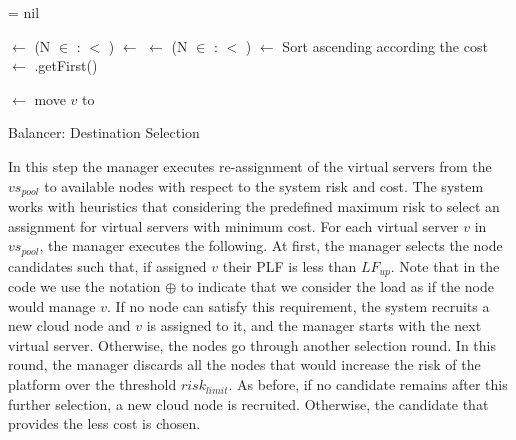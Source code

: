 \documentclass[final,10pt,a5paper]{phdimt}
\theoremstyle{definition}
\begin{document}
\begin{algorithm}[tbh]




\BlankLine

{
	\Chosen = nil\;

\Npool $\leftarrow$ (N $\in$ \AN :  $<$ \ULimit)\;
	{
		\Chosen $\leftarrow$ \CC{}\;
	}
	\Else
	{
		\Npool $\leftarrow$ (N $\in$ \Npool :  $<$ \Risklimit)\;
		{
			\Chosen $\leftarrow$ \CC{}\;
		}
		\Else
		{
			Sort \Npool ascending according the cost\;
			\Chosen $\leftarrow$ \Npool.getFirst()\;
		}
	}
	
	\Actions $\leftarrow$ move $v$ to \Chosen\;
}


\caption{Balancer: Destination Selection} 
\label{alg:second}
\end{algorithm}

In this step  the manager executes re-assignment of the virtual servers from the $vs_{pool}$ to available nodes with respect to the system risk and cost. 
The system works with heuristics that considering the predefined maximum risk to select an assignment for virtual servers with minimum cost. 
For each virtual server $v$ in $vs_{pool}$, the manager executes the following. 
At first, the manager selects the node candidates such that, if assigned $v$ their PLF is less than $LF_{up}$.
Note that in the code we use the notation $\oplus$ to indicate that we consider the load as if the node would manage $v$.
If no node can satisfy this requirement, the system recruits a new cloud node and $v$ is assigned to it, and the manager starts with the next virtual server. 
Otherwise, the nodes go through another selection round. In this round, the manager discards all the nodes that would increase the risk of the platform over the threshold $risk_{limit}$. As before, if no candidate remains after this further selection, a new cloud node is recruited.
Otherwise, the candidate that provides the less cost is chosen. 
\end{document}
